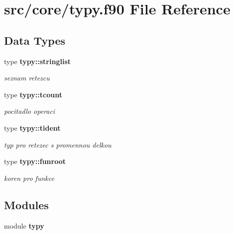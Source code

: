 \section{src/core/typy.f90 File Reference}
\label{typy_8f90}
\subsection*{Data Types}
\begin{DoxyCompactItemize}
\item 
type {\bf typy\+::stringlist}
\begin{DoxyCompactList}\small\item\em seznam retezcu \end{DoxyCompactList}\item 
type {\bf typy\+::tcount}
\begin{DoxyCompactList}\small\item\em pocitadlo operaci \end{DoxyCompactList}\item 
type {\bf typy\+::tident}
\begin{DoxyCompactList}\small\item\em typ pro retezec s promennou delkou \end{DoxyCompactList}\item 
type {\bf typy\+::funroot}
\begin{DoxyCompactList}\small\item\em koren pro funkce \end{DoxyCompactList}\end{DoxyCompactItemize}
\subsection*{Modules}
\begin{DoxyCompactItemize}
\item 
module {\bf typy}
\end{DoxyCompactItemize}
